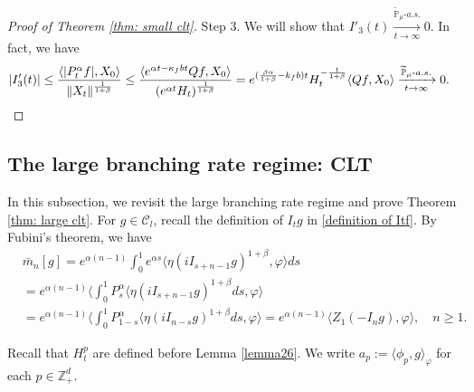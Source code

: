 \documentclass[12pt,a4paper]{amsart}
\theoremstyle{plain}
\theoremstyle{definition}
\numberwithin{equation}{section}
\begin{document}
\begin{proof}[Proof of Theorem \ref{thm: small clt}]
	Step 3. We will show that $I'_3(t) \xrightarrow[t\to \infty]{\widetilde {\mathbb P}_\mu \text{-} a.s.} 0$.
  In fact, we have
  \begin{align}
    & |I'_3(t)|
      \leq \frac{\langle |P^\alpha_tf|,X_0\rangle}{\|X_t\|^{\frac{1}{1+\beta}}}
      \leq \frac{\langle e^{\alpha t - \kappa_f b t}Qf,X_0\rangle}{(e^{\alpha t} H_t)^{\frac{1}{1+\beta}}}
      = e^{(\frac{\beta \alpha }{1+\beta} - k_fb)t} H_t^{-\frac{1}{1+\beta}} \langle Qf,X_0\rangle
      \xrightarrow[t\to \infty]{\widetilde {\mathbb P}_\mu \text{-} a.s.} 0.
      \qedhere
  \end{align}
\end{proof}

\subsection{The large branching rate regime: CLT}
\label{sec: large rate clt}
In this subsection, we revisit the large branching rate regime and prove Theorem \ref{thm: large clt}.
For $g\in \mathcal{C}_l$, recall the definition of $I_tg$ in \eqref{definition of Itf}.
By Fubini's theorem, we have
\begin{align}
  \label{equ: transform of mn}
  & \bar{m}_n[g]
    = e^{\alpha(n-1)}\int_0^1 e^{\alpha s}\langle \eta(iI_{s+n-1}g)^{1+\beta}, \varphi\rangle ds \\   
  & = e^{\alpha(n-1)}\langle \int_0^1 P_s^{\alpha}\langle \eta(iI_{s+n-1}g)^{1+\beta}ds, \varphi\rangle\\
  & =e^{\alpha(n-1)}\langle \int_0^1 P_{1-s}^{\alpha}\langle \eta(iI_{n-s}g)^{1+\beta}ds, \varphi\rangle=e^{\alpha(n-1)}\langle Z_1(-I_ng), \varphi\rangle,
    \quad n\geq 1.
\end{align}

Recall that $H^p_t$ are defined before Lemma \ref{lemma26}. We write $a_p:= \langle \phi_p, g\rangle_\varphi$ for each $p \in \mathbb Z_+^d$.
\end{document}
